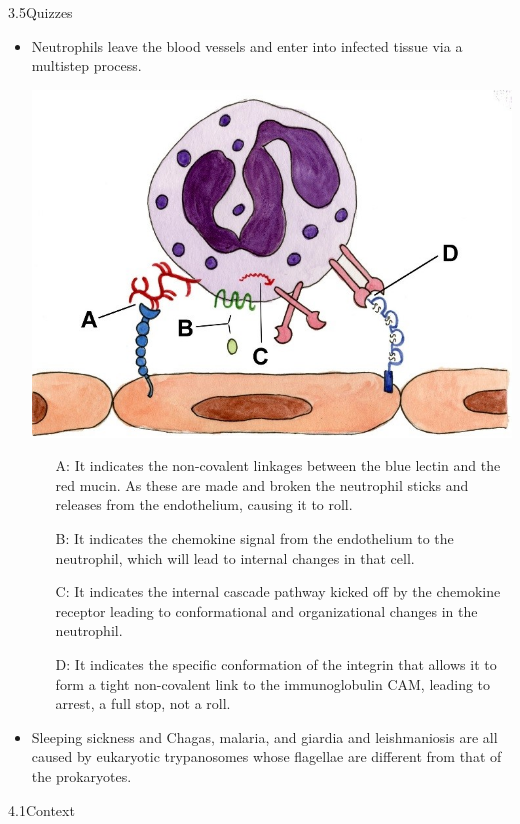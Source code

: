 \documentclass[UTF8]{book}
\begin{document}
3.5\quad Quizzes
\begin{itemize}
\item Neutrophils leave the blood vessels
and enter into infected tissue via a multistep process.
\begin{center}
\includegraphics[scale=0.75]{3.5.1.png}
\end{center}
\begin{itemize}
	\item[A:] It indicates the non-covalent linkages between the blue lectin and the red mucin. As these are made and broken the neutrophil sticks and releases from the
endothelium, causing it to roll.
	\item[B:] It indicates the chemokine signal from the endothelium to the
neutrophil, which will lead to internal changes in that cell.
	\item[C:] It indicates the internal cascade pathway kicked off by the chemokine receptor leading to conformational and organizational changes in the neutrophil.
	\item[D:] It indicates the specific conformation of the integrin that allows it to form a tight non-covalent link to the immunoglobulin CAM, leading to arrest, a full stop, not a roll.
\end{itemize}
\item Sleeping sickness and Chagas, malaria, and giardia and leishmaniosis are all caused by eukaryotic trypanosomes whose flagellae are different from that of the prokaryotes.
\end{itemize}
4.1\quad Context
\end{document}
